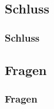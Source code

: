 
\subsection{Schluss}

\begin{frame}
  \frametitle{Schluss}

\end{frame}

\subsection{Fragen}
\begin{frame}
  \frametitle{Fragen}
\end{frame}



